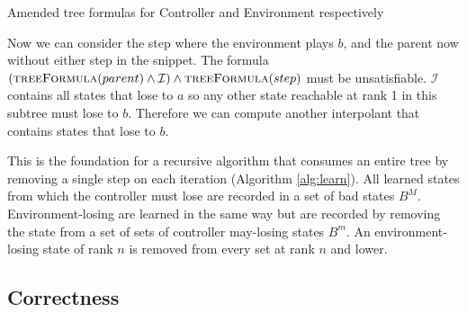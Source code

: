 \documentclass{llncs}
\newcommand{\textoverline}[1]{$\overline{\mbox{#1}}$}
\begin{document}
\begin{algorithm}
    \caption{Amended tree formulas for Controller and Environment respectively}
    \label{alg:unboundedTreeFormula}
    \begin{algorithmic}[1]
        \State {}
        \Else
        \State {}
        \EndIf
        \EndFunction
    \end{algorithmic}

    \begin{algorithmic}
        \Function{\textoverline{treeFormula}}{gt}
        \State {}
        \Else
        \State {}
        \EndIf
        \EndFunction
    \end{algorithmic}
\end{algorithm}

Now we can consider the step where the environment plays $b$, and the parent
now without either step in the snippet. The formula
$(\textsc{treeFormula}(parent) \land \mathcal{I}) \land
\textsc{treeFormula}(step)$ must be unsatisfiable.  $\mathcal{I}$ contains all
states that lose to $a$ so any other state reachable at rank 1 in this subtree
must lose to $b$.  Therefore we can compute another interpolant that contains
states that lose to $b$.

This is the foundation for a recursive algorithm that consumes an entire tree
by removing a single step on each iteration (Algorithm \ref{alg:learn}). All
learned states from which the controller must lose are recorded in a set of bad
states $B^M$. Environment-losing are learned in the same way but are recorded
by removing the state from a set of sets of controller may-losing states $B^m$.
An environment-losing state of rank $n$ is removed from every set at rank $n$
and lower.

\subsection{Correctness}
\end{document}
